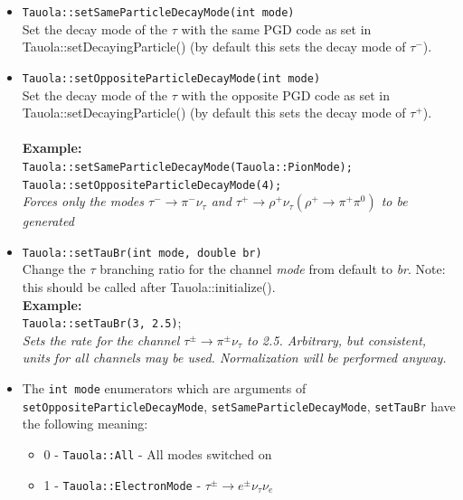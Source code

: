 \documentclass[]{Tauola_interface_design}
\begin{document}
\begin{itemize}
 \item {\tt Tauola::setSameParticleDecayMode(int mode)} \hfill \\
Set the decay mode of the  $\tau$ with the same PGD code as set in \\
Tauola::setDecayingParticle() (by default this sets the decay mode of $\tau^-$). \\
 \item {\tt Tauola::setOppositeParticleDecayMode(int mode)} \hfill \\ 
Set the decay mode of the  $\tau$ with the opposite PGD code as set in \\
Tauola::setDecayingParticle() (by default this sets the decay mode of $\tau^+$). \\ \\
\noindent
\textbf{Example:} \hfill \\
{\tt Tauola::setSameParticleDecayMode(Tauola::PionMode); } \\
{\tt Tauola::setOppositeParticleDecayMode(4); } \\
\emph{ Forces only the modes $\tau^- \rightarrow \pi^- \nu_{\tau}$ and 
  $\tau^+ \rightarrow \rho^+ \nu_{\tau} (\rho^+ \rightarrow \pi^+ \pi^0)$ to be generated  }\hfill \\ 
 \item {\tt Tauola::setTauBr(int mode, double br)} \hfill \\
Change  the $\tau$ branching ratio for the channel
{\it mode} from default to {\it br}. Note: this should be called after Tauola::initialize(). \hfill \\ 
\noindent
\textbf{Example:} \hfill \\
{\tt Tauola::setTauBr(3, 2.5)};\\
\emph{Sets the rate for the channel $\tau^\pm \rightarrow \pi^\pm \nu_{\tau}$ to 2.5. 
Arbitrary, but consistent, units for all channels may be used. Normalization
will be performed anyway. }\hfill \\
\item The  {\tt int mode} enumerators which are arguments 
  of {\tt setOppositeParticleDecayMode}, {\tt setSameParticleDecayMode}, 
  {\tt setTauBr} have the following meaning:
      \begin{itemize}
        \item 0 - {\tt Tauola::All} - All modes switched on
        \item 1 - {\tt Tauola::ElectronMode} - $\tau^{\pm} \rightarrow e^{\pm} \nu_{\tau} \nu_{e}$

\end{itemize}
\end{itemize}
\end{document}
